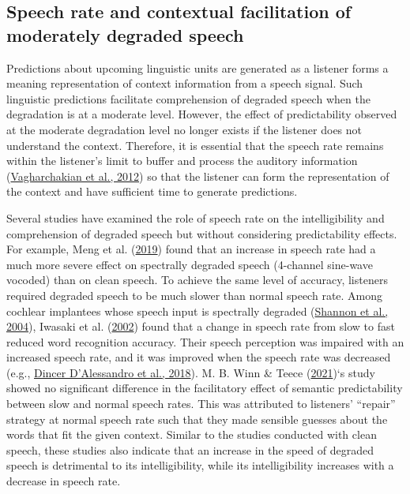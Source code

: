 \documentclass[a4paper, nobind]{templates/ociamthesis}
\begin{document}
\hypertarget{speech-rate-and-contextual-facilitation-of-moderately-degraded-speech}{%
\subsection{Speech rate and contextual facilitation of moderately degraded speech}\label{speech-rate-and-contextual-facilitation-of-moderately-degraded-speech}}

Predictions about upcoming linguistic units are generated as a listener forms a meaning representation of context information from a speech signal. Such linguistic predictions facilitate comprehension of degraded speech when the degradation is at a moderate level.
However, the effect of predictability observed at the moderate degradation level no longer exists if the listener does not understand the context.
Therefore, it is essential that the speech rate remains within the listener's limit to buffer and process the auditory information (\protect\hyperlink{ref-Vagharchakian2012}{Vagharchakian et al., 2012}) so that the listener can form the representation of the context and have sufficient time to generate predictions.

Several studies have examined the role of speech rate on the intelligibility and comprehension of degraded speech but without considering predictability effects.
For example, Meng et al. (\protect\hyperlink{ref-Meng2019}{2019}) found that an increase in speech rate had a much more severe effect on spectrally degraded speech (4-channel sine-wave vocoded) than on clean speech.
To achieve the same level of accuracy, listeners required degraded speech to be much slower than normal speech rate.
Among cochlear implantees whose speech input is spectrally degraded (\protect\hyperlink{ref-Shannon2004}{Shannon et al., 2004}), Iwasaki et al. (\protect\hyperlink{ref-Iwasaki2002}{2002}) found that a change in speech rate from slow to fast reduced word recognition accuracy.
Their speech perception was impaired with an increased speech rate, and it was improved when the speech rate was decreased (e.g., \protect\hyperlink{ref-Dincer2018}{Dincer D'Alessandro et al., 2018}).
M. B. Winn \& Teece (\protect\hyperlink{ref-Winn2021}{2021})`s study showed no significant difference in the facilitatory effect of semantic predictability between slow and normal speech rates.
This was attributed to listeners' ``repair'' strategy at normal speech rate such that they made sensible guesses about the words that fit the given context.
Similar to the studies conducted with clean speech, these studies also indicate that an increase in the speed of degraded speech is detrimental to its intelligibility, while its intelligibility increases with a decrease in speech rate.
\end{document}
